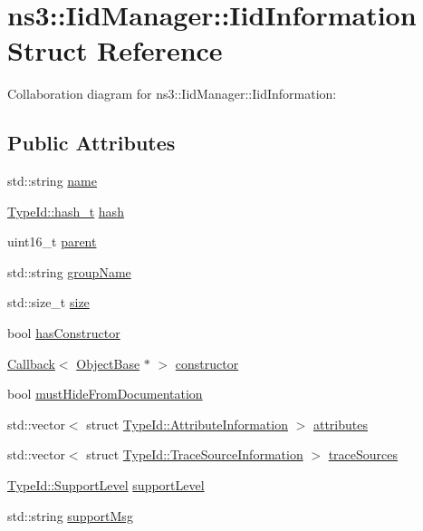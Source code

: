 \hypertarget{structns3_1_1IidManager_1_1IidInformation}{}\section{ns3\+:\+:Iid\+Manager\+:\+:Iid\+Information Struct Reference}
\label{structns3_1_1IidManager_1_1IidInformation}


Collaboration diagram for ns3\+:\+:Iid\+Manager\+:\+:Iid\+Information\+:
\subsection*{Public Attributes}
\begin{DoxyCompactItemize}
\item 
std\+::string \hyperlink{structns3_1_1IidManager_1_1IidInformation_a93b31c1c5e8326dffa684bbfc516f429}{name}
\item 
\hyperlink{classns3_1_1TypeId_ab3fc1475c4a0c2cfb35b976dbd609057}{Type\+Id\+::hash\+\_\+t} \hyperlink{structns3_1_1IidManager_1_1IidInformation_abe6c59d16cffb91fc703d35a187eed1e}{hash}
\item 
uint16\+\_\+t \hyperlink{structns3_1_1IidManager_1_1IidInformation_a1b224389afab82f4a8e5d17227387b60}{parent}
\item 
std\+::string \hyperlink{structns3_1_1IidManager_1_1IidInformation_a096dd5f8414ab8077de95bfbeb039073}{group\+Name}
\item 
std\+::size\+\_\+t \hyperlink{structns3_1_1IidManager_1_1IidInformation_a815c69fdfdf6d43c59f16b9e5d4847f6}{size}
\item 
bool \hyperlink{structns3_1_1IidManager_1_1IidInformation_a9ee269731a2532bde60cf37ecac0ee18}{has\+Constructor}
\item 
\hyperlink{classns3_1_1Callback}{Callback}$<$ \hyperlink{classns3_1_1ObjectBase}{Object\+Base} $\ast$ $>$ \hyperlink{structns3_1_1IidManager_1_1IidInformation_a7217a19e81767b4b685d0c7bae02764d}{constructor}
\item 
bool \hyperlink{structns3_1_1IidManager_1_1IidInformation_aab1c6a5e3b78ce2fb5da67c24cb7106f}{must\+Hide\+From\+Documentation}
\item 
std\+::vector$<$ struct \hyperlink{structns3_1_1TypeId_1_1AttributeInformation}{Type\+Id\+::\+Attribute\+Information} $>$ \hyperlink{structns3_1_1IidManager_1_1IidInformation_a4ba890d012d1abc962f339e18eb9050c}{attributes}
\item 
std\+::vector$<$ struct \hyperlink{structns3_1_1TypeId_1_1TraceSourceInformation}{Type\+Id\+::\+Trace\+Source\+Information} $>$ \hyperlink{structns3_1_1IidManager_1_1IidInformation_ac00222831c965ad955e5ce3b9badf86c}{trace\+Sources}
\item 
\hyperlink{classns3_1_1TypeId_ad55d31e57490a83a3ededa096a8d2588}{Type\+Id\+::\+Support\+Level} \hyperlink{structns3_1_1IidManager_1_1IidInformation_afd31dd228a6b5687ccefec579b30d5eb}{support\+Level}
\item 
std\+::string \hyperlink{structns3_1_1IidManager_1_1IidInformation_a86ba4a9a7826d3f489f406ce12b8e67a}{support\+Msg}
\end{DoxyCompactItemize}



